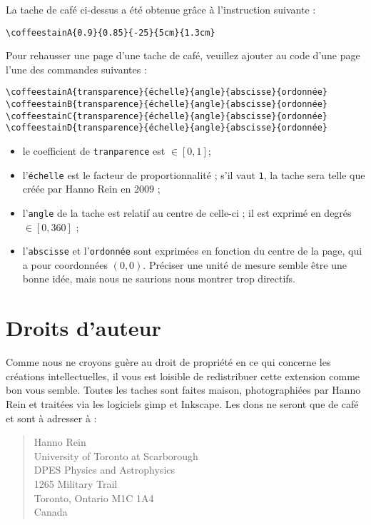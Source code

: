\documentclass[a4paper, 11pt, BCOR = 0 pt, DIV = 13, oneside, french]{scrartcl}
\begin{document}
\begin{tcolorbox}
  La tache de café ci-dessus a été obtenue grâce à l'instruction suivante :

  \verb|\coffeestainA{0.9}{0.85}{-25}{5cm}{1.3cm}|
\end{tcolorbox}
\newpage{}
\label{stainB}

Pour rehausser une page d'une tache de café, veuillez ajouter au code d'une page
l'une des commandes suivantes :
\begin{verbatim}
\coffeestainA{transparence}{échelle}{angle}{abscisse}{ordonnée}
\coffeestainB{transparence}{échelle}{angle}{abscisse}{ordonnée}
\coffeestainC{transparence}{échelle}{angle}{abscisse}{ordonnée}
\coffeestainD{transparence}{échelle}{angle}{abscisse}{ordonnée}
\end{verbatim}

\begin{itemize}
\item le coefficient de \texttt{tranparence} est $\in [0,1]$;
\item l'\texttt{échelle} est le facteur de proportionnalité ; s'il vaut \texttt{1},
  la tache sera telle que créée par Hanno Rein en 2009 ;
\item l'\texttt{angle} de la tache est relatif au centre de celle-ci ; il est exprimé en
  degrés $\in [0,360]$ ;
\item l'\texttt{abscisse} et l'\texttt{ordonnée} sont exprimées en
  fonction du centre de la page, qui a pour coordonnées $(0, 0)$. Préciser une
  unité de mesure semble être une bonne idée, mais nous ne saurions nous montrer
  trop directifs.
\end{itemize}

\section{Droits d'auteur}
Comme nous ne croyons guère au droit de propriété en ce qui concerne les
créations intellectuelles, il vous est loisible de redistribuer cette extension
comme bon vous semble. Toutes les taches sont faites maison, photographiées par
Hanno Rein et traitées via les logiciels gimp et Inkscape. Les dons ne seront
que de café et sont à adresser à :
\begin{quote}
Hanno Rein\\
University of Toronto at Scarborough\\
DPES Physics and Astrophysics\\
1265 Military Trail\\
Toronto, Ontario M1C 1A4\\
Canada
\end{quote}
\end{document}
